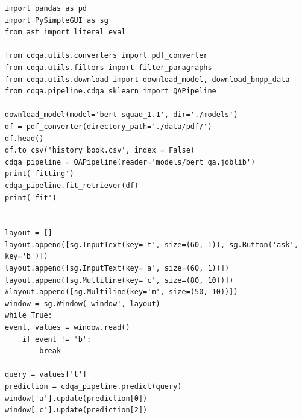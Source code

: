 \documentclass[a4paper,12pt,preview]{report} %
\begin{document}
\begin{verbatim}
import pandas as pd
import PySimpleGUI as sg
from ast import literal_eval

from cdqa.utils.converters import pdf_converter
from cdqa.utils.filters import filter_paragraphs
from cdqa.utils.download import download_model, download_bnpp_data
from cdqa.pipeline.cdqa_sklearn import QAPipeline

download_model(model='bert-squad_1.1', dir='./models')
df = pdf_converter(directory_path='./data/pdf/')
df.head()
df.to_csv('history_book.csv', index = False)
cdqa_pipeline = QAPipeline(reader='models/bert_qa.joblib')
print('fitting')
cdqa_pipeline.fit_retriever(df)
print('fit')


layout = []
layout.append([sg.InputText(key='t', size=(60, 1)), sg.Button('ask', key='b')])
layout.append([sg.InputText(key='a', size=(60, 1))])
layout.append([sg.Multiline(key='c', size=(80, 10))])
#layout.append([sg.Multiline(key='m', size=(50, 10))])
window = sg.Window('window', layout)
while True:
event, values = window.read()
    if event != 'b':
        break

query = values['t']
prediction = cdqa_pipeline.predict(query)
window['a'].update(prediction[0])
window['c'].update(prediction[2])

\end{verbatim}


	
	
	
\end{document}
